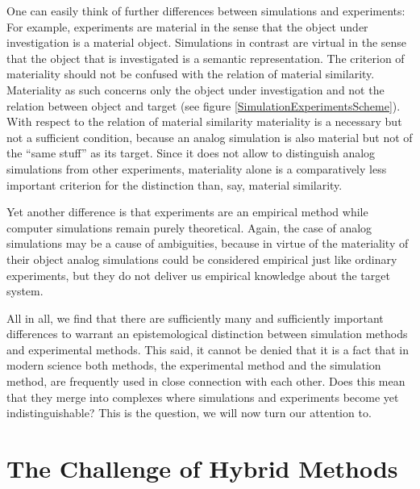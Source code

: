 \documentclass[12pt, a4paper]{article}
\numberwithin{equation}{section}
\begin{document}
One can easily think of further differences between simulations and experiments: For example, experiments are material in the sense that the object under investigation is a material object. Simulations in contrast are virtual in the sense that the object that is investigated is a semantic representation. The criterion of materiality should not be confused with the relation of material similarity. Materiality as such concerns only the object under investigation and not the relation between object and target (see figure \ref{SimulationExperimentsScheme}). With respect to the relation of material similarity materiality is a necessary but not a sufficient condition, because an analog simulation is also material but not of the ``same stuff'' as its target. Since it does not allow to distinguish analog simulations from other experiments, materiality alone is a comparatively less important criterion for the distinction than, say, material similarity.

Yet another difference is that experiments are an empirical method while computer simulations remain purely theoretical. Again, the case of analog simulations may be a cause of ambiguities, because in virtue of the materiality of their object analog simulations could be considered empirical just like ordinary experiments, but they do not deliver us empirical knowledge about the target system.

All in all, we find that there are sufficiently many and sufficiently important differences to warrant an epistemological distinction between simulation methods and experimental methods. This said, it cannot be denied that it is a fact that in modern science both methods, the experimental method and the simulation method, are frequently used in close connection with each other. Does this mean that they merge into complexes where simulations and experiments become yet indistinguishable? This is the question, we will now turn our attention to.


\section{The Challenge of Hybrid Methods}
\end{document}
